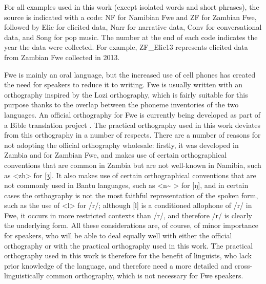For all examples used in this work (except isolated words and short phra\-ses), the source is indi\-cated with a code: NF for Namibian Fwe and ZF for Zambian Fwe, followed by Elic for elicited data, Narr for narrative data, Conv for conversational data, and Song for pop music. The number at the end of each code indicates the year the data were collected. For example, ZF\_Elic13 repre\-sents elicited data from Zambian Fwe collected in 2013.

Fwe is mainly an oral language, but the increased use of cell phones has created the need for speakers to reduce it to writing. Fwe is usually written with an orthography inspired by the Lozi orthography, which is fairly suitable for this purpose thanks to the overlap between the phoneme inventories of the two languages. An official orthography for Fwe is currently being developed as part of a Bible translation project \citep{Bow2013}. The practical orthography used in this work devi\-ates from this orthography in a number of respects. There are a number of reasons for not adopt\-ing the official orthography wholesale: firstly, it was developed in Zambia and for Zambian Fwe, and makes use of certain orthographical conventions that are common in Zambia but are not well-known in Namibia, such as <zh> for [ʒ]. It also makes use of certain orthographical conven\-tions that are not commonly used in Bantu languages, such as <n\~{} > for [ŋ], and in certain cases the orthography is not the most faithful representation of the spoken form, such as the use of <l> for /r/; although [l] is a conditioned allophone of /r/ in Fwe, it occurs in more restricted contexts than /r/, and therefore /r/ is clearly the underlying form. All these considerations are, of course, of mi\-nor importance for speakers, who will be able to deal equally well with either the official orthography or with the practical orthography used in this work. The practical orthography used in this work is therefore for the benefit of linguists, who lack prior knowledge of the language, and therefore need a more detailed and cross-linguistically common ortho\-graphy, which is not necessary for Fwe speakers.

